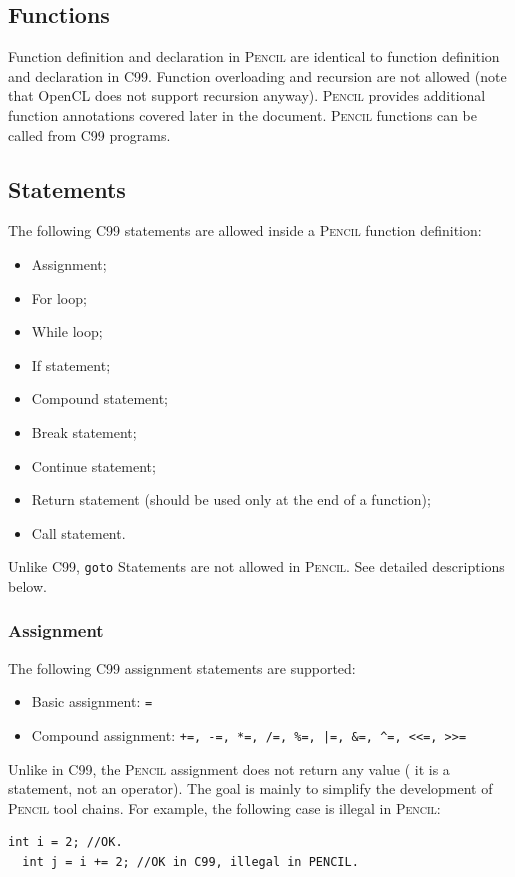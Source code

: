 \documentclass{carp}
\newcommand\pencil{\textsc{Pencil}\xspace}
\newcommand{\C}{C99\xspace}
\begin{document}
\subsection{Functions}
Function definition and declaration in \pencil are identical to function
definition and declaration in \C.
Function overloading and recursion are not allowed (note that OpenCL does
not support recursion anyway).
\pencil provides additional
function annotations covered later in the document. \pencil functions can
be called from \C programs.

\subsection{Statements}
The following \C statements are allowed inside a \pencil function definition:
\begin{itemize}
  \item Assignment;
  \item For loop;
  \item While loop;
  \item If statement;
  \item Compound statement;
  \item Break statement;
  \item Continue statement;
  \item Return statement (should be used only at the end of a function);
  \item Call statement.
\end{itemize}
Unlike \C, \lstinline!goto! Statements are not allowed in \pencil.
See detailed descriptions below.

\subsubsection{Assignment}
\label{sec:assignments}
The following \C assignment statements are supported:
\begin{itemize}
  \item Basic assignment: \lstinline!=!
  \item Compound assignment: \lstinline{+=, -=, *=, /=, %=, |=, &=, ^=, <<=, >>=}
\end{itemize}

Unlike in \C, the \pencil assignment does not return any value (\ie
it is a statement, not an operator).
The goal is mainly to simplify the development of \pencil tool chains.
For example, the following case is illegal in \pencil:
\begin{lstlisting}[language=pencil]
  int i = 2; //OK.
  int j = i += 2; //OK in C99, illegal in PENCIL.
\end{lstlisting}
\end{document}
